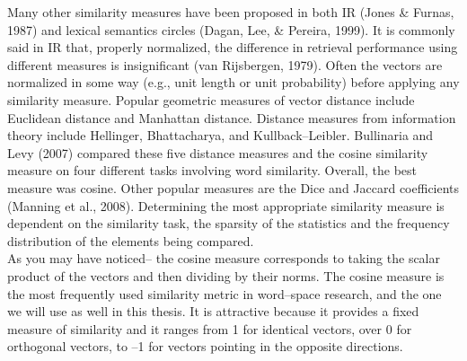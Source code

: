 Many other similarity measures have been proposed in both IR (Jones \& Furnas, 1987) and lexical 
semantics circles (Dagan, Lee, \& Pereira, 1999). It is commonly said in IR that, properly 
normalized, the difference in retrieval performance using different measures is insignificant (van 
Rijsbergen, 1979). Often the vectors are normalized in some way (e.g., unit length or unit probability) 
before applying any similarity measure. Popular geometric measures of vector distance include 
Euclidean distance and Manhattan distance. Distance measures from information theory include 
Hellinger, Bhattacharya, and Kullback--Leibler. Bullinaria and Levy (2007) compared these five distance 
measures and the cosine similarity measure on four different tasks involving word similarity. Overall, the 
best measure was cosine. Other popular measures are the Dice and Jaccard coefficients (Manning et 
al., 2008). Determining the most appropriate similarity measure is dependent on the similarity task, the 
sparsity of the statistics and the frequency distribution of the elements being compared. 
\\As you may have noticed-- the cosine measure corresponds to taking the scalar product of the vectors and then dividing by their norms. The cosine measure is the most frequently used similarity metric in word--space research, and the one we will use as well in this thesis. It is attractive because it provides a fixed measure of similarity and it ranges from 1 for identical vectors, over 0 for orthogonal vectors, to --1 for vectors pointing in the opposite directions.